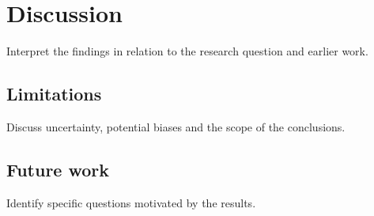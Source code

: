 \chapter{Discussion}
Interpret the findings in relation to the research question and earlier work.
\section{Limitations}
Discuss uncertainty, potential biases and the scope of the conclusions.
\section{Future work}
Identify specific questions motivated by the results.
